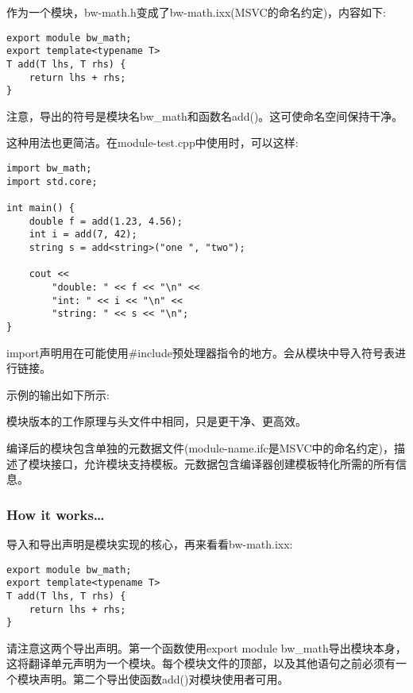 作为一个模块，bw-math.h变成了bw-math.ixx(MSVC的命名约定)，内容如下:

\begin{lstlisting}[style=styleCXX]
export module bw_math;
export template<typename T>
T add(T lhs, T rhs) {
	return lhs + rhs;
}
\end{lstlisting}

注意，导出的符号是模块名bw\_math和函数名add()。这可使命名空间保持干净。

这种用法也更简洁。在module-test.cpp中使用时，可以这样:

\begin{lstlisting}[style=styleCXX]
import bw_math;
import std.core;

int main() {
	double f = add(1.23, 4.56);
	int i = add(7, 42);
	string s = add<string>("one ", "two");
	
	cout <<
		"double: " << f << "\n" <<
		"int: " << i << "\n" <<
		"string: " << s << "\n";
}
\end{lstlisting}

import声明用在可能使用\#include预处理器指令的地方。会从模块中导入符号表进行链接。

示例的输出如下所示:


模块版本的工作原理与头文件中相同，只是更干净、更高效。

\begin{tcolorbox}[colback=webgreen!5!white,colframe=webgreen!75!black,title=Note]
编译后的模块包含单独的元数据文件(module-name.ifc是MSVC中的命名约定)，描述了模块接口，允许模块支持模板。元数据包含编译器创建模板特化所需的所有信息。
\end{tcolorbox}

\subsubsection{How it works…}

导入和导出声明是模块实现的核心，再来看看bw-math.ixx:

\begin{lstlisting}[style=styleCXX]
export module bw_math;
export template<typename T>
T add(T lhs, T rhs) {
	return lhs + rhs;
}
\end{lstlisting}

请注意这两个导出声明。第一个函数使用export module bw\_math导出模块本身，这将翻译单元声明为一个模块。每个模块文件的顶部，以及其他语句之前必须有一个模块声明。第二个导出使函数add()对模块使用者可用。


